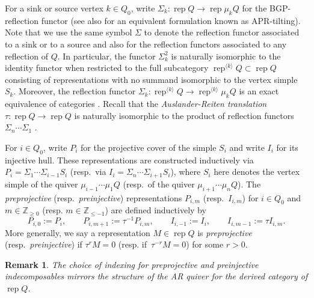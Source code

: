 \documentclass{amsart}
\newtheorem{lemma}[theorem]{Lemma}
\newtheorem{remark}[theorem]{Remark}
\numberwithin{equation}{section}
\newcommand{\ZZ}{\mathbb{Z}}
\newcommand{\Hom}{\operatorname{Hom}}
\newcommand{\Irr}{\operatorname{Irr}}
\newcommand{\rep}{\operatorname{rep}}
\begin{document}
For a sink or source vertex $k\in Q_0$, write $\Sigma_k:\rep Q\to\rep \mu_k Q$ for the BGP-reflection functor \cite{BGP??} (see also \cite{APR??} for an equivalent formulation known as APR-tilting).
Note that we use the same symbol $\Sigma$ to denote the reflection functor associated to a sink or to a source and also for the reflection functors associated to any reflection of $Q$.
In particular, the functor $\Sigma_k^2$ is naturally isomorphic to the identity functor when restricted to the full subcategory $\rep^{\langle k\rangle} Q\subset\rep Q$ consisting of representations with no summand isomorphic to the vertex simple $S_k$.
Moreover, the reflection functor $\Sigma_k:\rep^{\langle k\rangle} Q\to\rep^{\langle k\rangle} \mu_k Q$ is an exact equivalence of categories \cite{DR76}.
Recall that the \emph{Auslander-Reiten translation} $\tau:\rep Q\to\rep Q$ is naturally isomorphic to the product of reflection functors $\Sigma_n\cdots\Sigma_1$ \cite{BB??}.

For $i\in Q_0$, write $P_i$ for the projective cover of the simple $S_i$ and write $I_i$ for its injective hull.
These representations are constructed inductively via $P_i=\Sigma_1\cdots\Sigma_{i-1}S_i$ (resp.~via $I_i=\Sigma_n\cdots\Sigma_{i+1}S_i$), where $S_i$ here denotes the vertex simple of the quiver $\mu_{i-1}\cdots\mu_1 Q$ (resp.~of the quiver $\mu_{i+1}\cdots\mu_n Q$).
The \emph{preprojective} (resp.~\emph{preinjective}) representations $P_{i,m}$ (resp.~$I_{i,m}$) for $i\in Q_0$ and $m\in\ZZ_{\ge0}$ (resp. $m\in\ZZ_{\le-1}$) are defined inductively by
\[
  P_{i,0}:=P_i,\qquad P_{i,m+1}:=\tau^{-1} P_{i,m},\qquad I_{i,-1}:=I_i,\qquad I_{i,m-1}:=\tau I_{i,m}.
\]
More generally, we say a representation $M\in\rep Q$ is \emph{preprojective} (resp.~\emph{preinjective}) if $\tau^r M=0$ (resp. if~$\tau^{-r} M=0$) for some $r>0$.
\begin{remark}
  The choice of indexing for preprojective and preinjective indecomposables mirrors the structure of the AR quiver for the derived category of $\rep Q$.
\end{remark}
\end{document}
